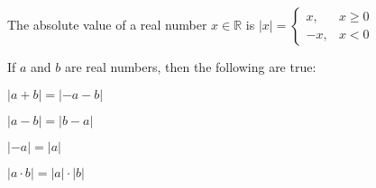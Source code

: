 \documentclass[crop=false,class=article,oneside]{standalone}
\begin{document}
        \begin{definition}
        The absolute value of a real number $x\in \mathbb{R}$ is $|x| = \begin{cases} x, & x \geq 0 \\ -x, & x<0 \end{cases}$
        \end{definition}
        \begin{theorem}
        If $a$ and $b$ are real numbers, then the following are true:
        \begin{enumerate}
        \begin{multicols}{4}
        \item $|a+b| = |-a-b|$
        \item $|a-b| = |b-a|$
        \item $|-a| = |a|$
        \item $|a\cdot b| = |a|\cdot |b|$
        \end{multicols}
        \end{enumerate}
        \end{theorem}
        
\end{document}
